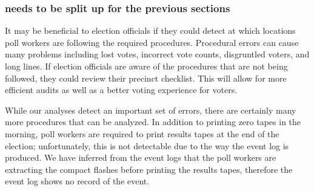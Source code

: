 \subsubsection{needs to be split up for the previous sections}
It may be beneficial to election officials if they could detect at which locations poll workers are following the required procedures.  Procedural errors can cause many problems including lost votes, incorrect vote counts, disgruntled voters, and long lines.  If election officials are aware of the procedures that are not being followed, they could review their precinct checklist.  This will allow for more efficient audits as well as a better voting experience for voters.  

While our analyses detect an important set of errors, there are certainly many more procedures that can be analyzed.  In addition to printing zero tapes in the morning, poll workers are required to print results tapes at the end of the election; unfortunately, this is not detectable due to the way the event log is produced.  We have inferred from the event logs that the poll workers are extracting the compact flashes before printing the results tapes, therefore the event log shows no record of the event.  


